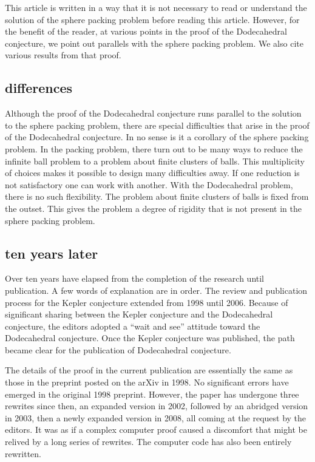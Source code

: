 This article is written in a way that it is not necessary to
read or understand the solution of the sphere packing problem before
reading this article.  However, for the benefit of the reader,
at various points in the proof
of the Dodecahedral conjecture, we point out 
parallels with the sphere packing problem.  We also cite various results
from that proof.



\subsection{differences}

Although the proof of the Dodecahedral conjecture runs parallel
to the solution to the sphere packing problem, there are special
difficulties that arise in the proof of the Dodecahedral conjecture.
In no sense is it a corollary of the sphere packing problem.
In the packing problem, there turn out to be many ways to
reduce the infinite ball problem to a problem about finite clusters
of balls.  This multiplicity of choices makes it
possible to design many difficulties away.  If one reduction is
not satisfactory one can work with
another.
With the Dodecahedral problem, there is no such flexibility.
The problem about finite clusters of balls is fixed from the outset.
This gives the problem a degree of rigidity that is not present
in the sphere packing problem.


\subsection{ten years later}

Over ten years have elapsed from the completion of the research until 
publication.  A few words of explanation are in order.
The review and 
publication process for the Kepler conjecture extended from 1998
until 2006.  Because of significant sharing between the Kepler conjecture
and the Dodecahedral conjecture, the editors adopted a ``wait and see''
attitude toward the Dodecahedral conjecture.  Once the Kepler conjecture
was published, the path became clear for the publication of Dodecahedral
conjecture.  

The details of the proof in the current publication are essentially the
same as those in the preprint posted on the arXiv in 1998.  No
significant errors have emerged in the original 1998 preprint.   However,
the paper has undergone three rewrites since then, an expanded version in 2002, followed by an abridged version in 2003, then a newly expanded version in 2008, all coming at the request by the editors.  It was as if a complex computer proof caused a discomfort that might be relived by a long series of
rewrites. The computer code has
also been entirely rewritten.

